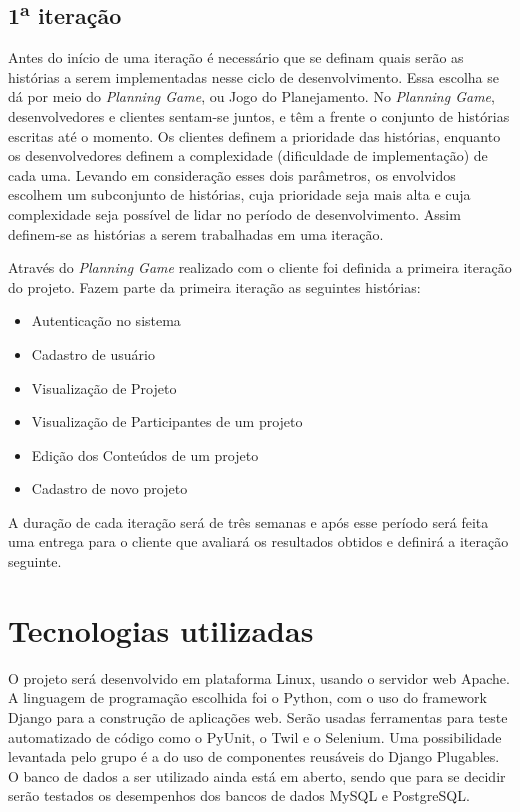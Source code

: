   \subsection{1\textsuperscript{a} iteração}
    Antes do início de uma iteração é necessário que se definam quais serão as histórias a serem implementadas nesse ciclo de desenvolvimento. Essa escolha se dá por meio do \textit{Planning Game}, ou Jogo do Planejamento. No \textit{Planning Game}, desenvolvedores e clientes sentam-se juntos, e têm a frente o conjunto de histórias escritas até o momento. Os clientes definem a prioridade das histórias, enquanto os desenvolvedores definem a complexidade (dificuldade de implementação) de cada uma. Levando em consideração esses dois parâmetros, os envolvidos escolhem um subconjunto de histórias, cuja prioridade seja mais alta e cuja complexidade seja possível de lidar no período de desenvolvimento. Assim definem-se as histórias a serem trabalhadas em uma iteração.

    Através do \textit{Planning Game} realizado com o cliente foi definida a primeira iteração do projeto. Fazem parte da primeira iteração as seguintes histórias:

    \begin{itemize}
      \item Autenticação no sistema
      \item Cadastro de usuário
      \item Visualização de Projeto
      \item Visualização de Participantes de um projeto
      \item Edição dos Conteúdos de um projeto
      \item Cadastro de novo projeto
    \end{itemize}

    A duração de cada iteração será de três semanas e após esse período será feita uma entrega para o cliente que avaliará os resultados obtidos e definirá a iteração seguinte.

\section{Tecnologias utilizadas}

  O projeto será desenvolvido em plataforma Linux, usando o servidor web Apache. A linguagem de programação escolhida foi o Python, com o uso do framework Django para a construção de aplicações web. Serão usadas ferramentas para teste automatizado de código como o PyUnit, o Twil e o Selenium. Uma possibilidade levantada pelo grupo é a do uso de componentes reusáveis do Django Plugables. O banco de dados a ser utilizado ainda está em aberto, sendo que para se decidir serão testados os desempenhos dos bancos de dados MySQL e PostgreSQL.

